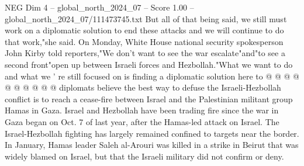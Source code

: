 \begin{textsample}{NEG Dim 4 – global\_north\_2024\_07 – Score 1.00 – global\_north\_2024\_07/111473745.txt}
But all of that being said, we still must work on a diplomatic solution to end these attacks and we will continue to do that work,"she said.
On Monday, White House national security spokesperson John Kirby told reporters,"We don't want to see the war escalate"and"to see a second front"open up between Israeli forces and Hezbollah."What we want to do and what we ' re still focused on is finding a diplomatic solution here to @ @ @ @ @ @ @ @ @ @ diplomats believe the best way to defuse the Israeli-Hezbollah conflict is to reach a cease-fire between Israel and the Palestinian militant group Hamas in Gaza.
Israel and Hezbollah have been trading fire since the war in Gaza began on Oct. 7 of last year, after the Hamas-led attack on Israel.
The Israel-Hezbollah fighting has largely remained confined to targets near the border.
In January, Hamas leader Saleh al-Arouri was killed in a strike in Beirut that was widely blamed on Israel, but that the Israeli military did not confirm or deny.

\end{textsample}
